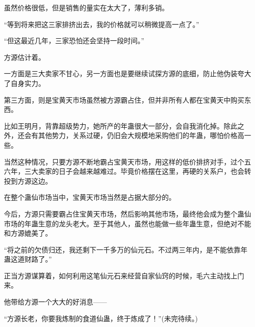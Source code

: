 \begin{this_body}
虽然价格很低，但是销售的量实在太大了，薄利多销。

“等到将来把这三家排挤出去，我的价格就可以稍微提高一点了。”

“但这最近几年，三家恐怕还会坚持一段时间。”

方源估计着。

一方面是三大卖家不甘心，另一方面也是要继续试探方源的底细，防止他伪装夸大了自身实力。

第三方面，则是宝黄天市场虽然被方源霸占住，但并非所有人都在宝黄天中购买东西。

比如王明月，背靠超级势力，她所产的年蛊很大一部分，会自我消化掉。除此之外，还会有其他势力，关系过硬，仍旧会大规模地采购他们的年蛊，哪怕价格高一些。

当然这种情况，只要方源不断地霸占宝黄天市场，用这样的低价排挤对手，过个五六年，三大卖家的日子会越来越难过。毕竟价格摆在这里，再硬的关系户，也会转投到方源这边。

在整个蛊仙市场当中，宝黄天市场当然是占据大部分的。

今后，方源只需要霸占住宝黄天市场，然后影响其他市场，最终他会成为整个蛊仙市场的年蛊生意的龙头老大。至于其他人，虽然也能做一些年蛊生意，但绝对不能和方源媲美了。

“将之前的欠债归还，我还剩下一千多万的仙元石。不过两三年内，是不能依靠年蛊这道财路了。”

正当方源谋算着，如何利用这笔仙元石来经营自家仙窍的时候，毛六主动找上门来。

他带给方源一个大大的好消息——

“方源长老，你要我炼制的食道仙蛊，终于炼成了！”(未完待续。)

\end{this_body}

